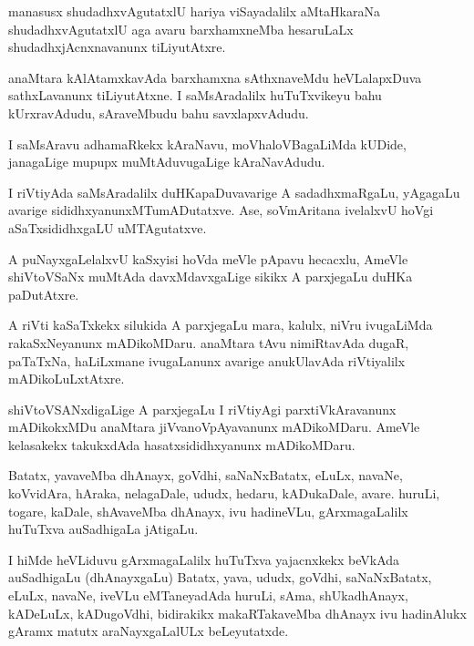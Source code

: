 \documentclass{article}
\begin{document}
\begin{mn}
manasusx shudadhxvAgutatxlU hariya viSayadalilx aMtaHkaraNa
shudadhxvAgutatxlU aga avaru barxhamxneMba hesaruLaLx
shudadhxjAcnxnavanunx tiLiyutAtxre.
\end{mn}

\begin{mn}
anaMtara kAlAtamxkavAda barxhamxna sAthxnaveMdu heVLalapxDuva
sathxLavanunx tiLiyutAtxne. I saMsAradalilx huTuTxvikeyu bahu
kUrxravAdudu, sAraveMbudu bahu savxlapxvAdudu.
\end{mn}

\begin{mn}
I saMsAravu adhamaRkekx kAraNavu, moVhaloVBagaLiMda kUDide, janagaLige
mupupx muMtAduvugaLige kAraNavAdudu.
\end{mn}

\begin{mn}
I riVtiyAda saMsAradalilx duHKapaDuvavarige A sadadhxmaRgaLu, yAgagaLu
avarige sididhxyanunxMTumADutatxve. Ase, soVmAritana ivelalxvU hoVgi
aSaTxsididhxgaLU uMTAgutatxve. 
\end{mn}

\begin{mn}
A puNayxgaLelalxvU kaSxyisi hoVda meVle pApavu hecacxlu, AmeVle
shiVtoVSaNx muMtAda davxMdavxgaLige sikikx A parxjegaLu duHKa paDutAtxre.
\end{mn}

\begin{mn}
A riVti kaSaTxkekx silukida A parxjegaLu mara, kalulx, niVru
ivugaLiMda rakaSxNeyanunx mADikoMDaru. anaMtara tAvu nimiRtavAda
dugaR, paTaTxNa, haLiLxmane ivugaLanunx avarige anukUlavAda
riVtiyalilx mADikoLuLxtAtxre.
\end{mn}

\begin{mn}
shiVtoVSANxdigaLige A parxjegaLu I riVtiyAgi parxtiVkAravanunx
mADikokxMDu anaMtara jiVvanoVpAyavanunx mADikoMDaru. AmeVle kelasakekx
takukxdAda hasatxsididhxyanunx mADikoMDaru.
\end{mn}

\begin{mn}
Batatx, yavaveMba dhAnayx, goVdhi, saNaNxBatatx, eLuLx, navaNe,
koVvidAra, hAraka, nelagaDale, ududx, hedaru, kADukaDale,
avare. huruLi, togare, kaDale, shAvaveMba dhAnayx, ivu hadineVLu,
gArxmagaLalilx huTuTxva auSadhigaLa jAtigaLu.
\end{mn}

\begin{mn}%
I hiMde heVLiduvu gArxmagaLalilx huTuTxva yajacnxkekx beVkAda
auSadhigaLu (dhAnayxgaLu) Batatx, yava, ududx, goVdhi, saNaNxBatatx,
eLuLx, navaNe, iveVLu eMTaneyadAda huruLi, sAma, shUkadhAnayx,
kADeLuLx, kADugoVdhi, bidirakikx makaRTakaveMba dhAnayx ivu hadinAlukx
gAramx matutx araNayxgaLalULx beLeyutatxde.
\end{mn}
\end{document}
